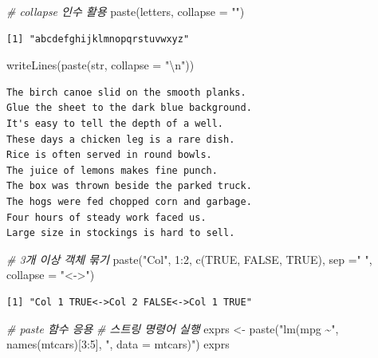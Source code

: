 \documentclass[
  11pt,
]{krantz}
\newenvironment{Shaded}{\begin{snugshade}}{\end{snugshade}}
\newcommand{\AttributeTok}[1]{\textcolor[rgb]{0.61,0.61,0.61}{#1}}
\newcommand{\CommentTok}[1]{\textcolor[rgb]{0.37,0.37,0.37}{\textit{#1}}}
\newcommand{\ConstantTok}[1]{\textcolor[rgb]{0,0,0}{#1}}
\newcommand{\DecValTok}[1]{\textcolor[rgb]{0.06,0.06,0.06}{#1}}
\newcommand{\FunctionTok}[1]{\textcolor[rgb]{0,0,0}{#1}}
\newcommand{\NormalTok}[1]{#1}
\newcommand{\OtherTok}[1]{\textcolor[rgb]{0.37,0.37,0.37}{#1}}
\newcommand{\SpecialCharTok}[1]{\textcolor[rgb]{0,0,0}{#1}}
\newcommand{\StringTok}[1]{\textcolor[rgb]{0.5,0.5,0.5}{#1}}
\begin{document}
\begin{Shaded}
\begin{Highlighting}[]
\CommentTok{\# collapse 인수 활용}
\FunctionTok{paste}\NormalTok{(letters, }\AttributeTok{collapse =} \StringTok{""}\NormalTok{)}
\end{Highlighting}
\end{Shaded}

\begin{verbatim}
[1] "abcdefghijklmnopqrstuvwxyz"
\end{verbatim}

\begin{Shaded}
\begin{Highlighting}[]
\FunctionTok{writeLines}\NormalTok{(}\FunctionTok{paste}\NormalTok{(str, }\AttributeTok{collapse =} \StringTok{"}\SpecialCharTok{\textbackslash{}n}\StringTok{"}\NormalTok{))}
\end{Highlighting}
\end{Shaded}

\begin{verbatim}
The birch canoe slid on the smooth planks.
Glue the sheet to the dark blue background.
It's easy to tell the depth of a well.
These days a chicken leg is a rare dish.
Rice is often served in round bowls.
The juice of lemons makes fine punch.
The box was thrown beside the parked truck.
The hogs were fed chopped corn and garbage.
Four hours of steady work faced us.
Large size in stockings is hard to sell.
\end{verbatim}

\begin{Shaded}
\begin{Highlighting}[]
\CommentTok{\# 3개 이상 객체 묶기}
\FunctionTok{paste}\NormalTok{(}\StringTok{"Col"}\NormalTok{, }\DecValTok{1}\SpecialCharTok{:}\DecValTok{2}\NormalTok{, }\FunctionTok{c}\NormalTok{(}\ConstantTok{TRUE}\NormalTok{, }\ConstantTok{FALSE}\NormalTok{, }\ConstantTok{TRUE}\NormalTok{), }\AttributeTok{sep =}\StringTok{" "}\NormalTok{, }\AttributeTok{collapse =} \StringTok{"\textless{}{-}\textgreater{}"}\NormalTok{)}
\end{Highlighting}
\end{Shaded}

\begin{verbatim}
[1] "Col 1 TRUE<->Col 2 FALSE<->Col 1 TRUE"
\end{verbatim}

\begin{Shaded}
\begin{Highlighting}[]
\CommentTok{\# paste 함수 응용}
\CommentTok{\# 스트링 명령어 실행 }
\NormalTok{exprs }\OtherTok{\textless{}{-}} \FunctionTok{paste}\NormalTok{(}\StringTok{"lm(mpg \textasciitilde{}"}\NormalTok{, }\FunctionTok{names}\NormalTok{(mtcars)[}\DecValTok{3}\SpecialCharTok{:}\DecValTok{5}\NormalTok{], }\StringTok{", data = mtcars)"}\NormalTok{)}
\NormalTok{exprs}
\end{Highlighting}
\end{Shaded}
\end{document}
